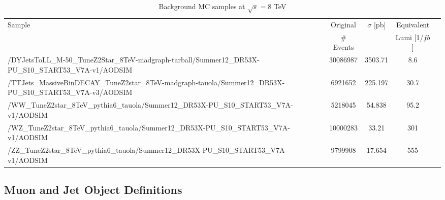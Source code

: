 \documentclass[12pt]{article}
\begin{document}
\begin{table}[h]
\begin{center}
\caption{\label{tab:BGSamples8TeV} Background MC samples at $\sqrt{s}=8$ TeV}
\begin{tabular}{|p{10cm}|c|c|c|c|} \hline
Sample & Original  & $\sigma$ [pb] & Equivalent \\
 &  \# Events &  &  Lumi [1/$fb$] \\
\hline
\hline
\scriptsize/DYJetsToLL\_M-50\_TuneZ2Star\_8TeV-madgraph-tarball/Summer12\_DR53X-PU\_S10\_START53\_V7A-v1/AODSIM &	     30086987 &	  3503.71 &   8.6  \\
\hline                                                                                                                                     
\scriptsize/TTJets\_MassiveBinDECAY\_TuneZ2star\_8TeV-madgraph-tauola/Summer12\_DR53X-PU\_S10\_START53\_V7A-v3/AODSIM &  6921652 &	  225.197 &  30.7  \\
\hline                                                                                                                                                       
\scriptsize/WW\_TuneZ2star\_8TeV\_pythia6\_tauola/Summer12\_DR53X-PU\_S10\_START53\_V7A-v1/AODSIM & 	              5218045 &	   54.838 &  95.2  \\
\hline                                                                                                                                     
\scriptsize/WZ\_TuneZ2star\_8TeV\_pythia6\_tauola/Summer12\_DR53X-PU\_S10\_START53\_V7A-v1/AODSIM &	             10000283 &	    33.21 & 301    \\
\hline                                                                                                                                     
\scriptsize/ZZ\_TuneZ2star\_8TeV\_pythia6\_tauola/Summer12\_DR53X-PU\_S10\_START53\_V7A-v1/AODSIM 	&  	              9799908 &    17.654 & 555	   \\
\hline
\end{tabular}
\end{center}
\end{table}

\subsection{Muon and Jet Object Definitions \label{MuonDef}}
\end{document}
